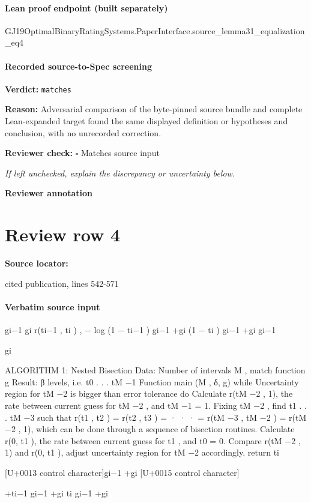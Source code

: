 \documentclass[10pt]{article}
\newcommand{\reviewerbox}{%
  \par\noindent\fbox{\parbox{0.96\linewidth}{\rule{0pt}{0.38in}}}\par
}
\newcommand{\reviewmatch}[1]{%
  \par\noindent\textbf{Reviewer check:} $\square$\; #1\par
  \noindent\emph{If left unchecked, explain the discrepancy or uncertainty below.}\par
}
\begin{document}
\paragraph{Lean proof endpoint (built separately)}\begin{ReviewVerbatim}
GJ19OptimalBinaryRatingSystems.PaperInterface.source_lemma31_equalization_eq4
\end{ReviewVerbatim}

\paragraph{Recorded source-to-Spec screening}
\textbf{Verdict:} \texttt{matches}
\\
{\raggedright
\textbf{Reason:} Adversarial comparison of the byte-\allowbreak{}pinned source bundle and complete Lean-\allowbreak{}expanded target found the same displayed definition or hypotheses and conclusion, with no unrecorded correction.\allowbreak{}
\par}
\reviewmatch{Matches source input}
\noindent\textbf{Reviewer annotation}\par
\reviewerbox
\clearpage
\hypertarget{source-claim-e679d8fd634fddb9}{}
\section*{Review row 4}
\textbf{Source locator:} {\footnotesize\raggedright cited publication, lines 542-\allowbreak{}571\par}
\paragraph{Verbatim source input}
\begin{ReviewVerbatim}
gi−1
gi
r(ti−1 , ti ) , − log (1 − ti−1 ) gi−1 +gi (1 − ti ) gi−1 +gi
gi−1

gi

ALGORITHM 1: Nested Bisection
Data: Number of intervals M , match function g
Result: β levels, i.e. {t0 . . . tM −1 }
Function main (M , δ, g)
while Uncertainty region for tM −2 is bigger
than error tolerance do
Calculate r(tM −2 , 1), the rate between
current guess for tM −2 , and tM −1 = 1.
Fixing tM −2 , find t1 . . . tM −3 such that
r(t1 , t2 ) = r(t2 , t3 ) = · · · =
r(tM −3 , tM −2 ) = r(tM −2 , 1), which can be
done through a sequence of bisection
routines.
Calculate r(0, t1 ), the rate between current
guess for t1 , and t0 = 0.
Compare r(tM −2 , 1) and r(0, t1 ), adjust
uncertainty region for tM −2 accordingly.
return {ti }

[U+0013 control character]gi−1 +gi [U+0015 control character]

+ti−1 gi−1 +gi ti gi−1 +gi
\end{ReviewVerbatim}
\end{document}
